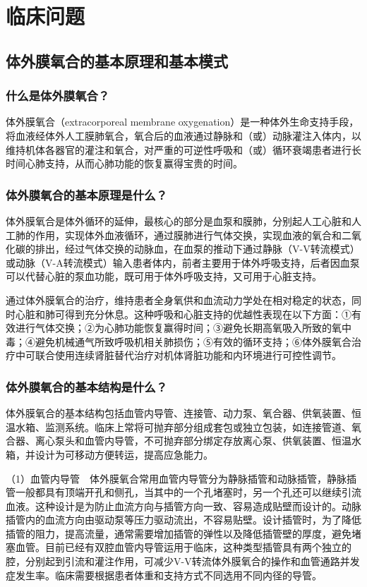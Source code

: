 \section{临床问题}

\subsection{体外膜氧合的基本原理和基本模式}

\subsubsection{什么是体外膜氧合？}

体外膜氧合（extracorporeal membrane
oxygenation）是一种体外生命支持手段，将血液经体外人工膜肺氧合，氧合后的血液通过静脉和（或）动脉灌注入体内，以维持机体各器官的灌注和氧合，对严重的可逆性呼吸和（或）循环衰竭患者进行长时间心肺支持，从而心肺功能的恢复赢得宝贵的时间。

\subsubsection{体外膜氧合的基本原理是什么？}

体外膜氧合是体外循环的延伸，最核心的部分是血泵和膜肺，分别起人工心脏和人工肺的作用，实现体外血液循环，通过膜肺进行气体交换，实现血液的氧合和二氧化碳的排出，经过气体交换的动脉血，在血泵的推动下通过静脉（V-V转流模式）或动脉（V-A转流模式）输入患者体内，前者主要用于体外呼吸支持，后者因血泵可以代替心脏的泵血功能，既可用于体外呼吸支持，又可用于心脏支持。

通过体外膜氧合的治疗，维持患者全身氧供和血流动力学处在相对稳定的状态，同时心脏和肺可得到充分休息。这种呼吸和心脏支持的优越性表现在以下方面：①有效进行气体交换；②为心肺功能恢复赢得时间；③避免长期高氧吸入所致的氧中毒；④避免机械通气所致呼吸机相关肺损伤；⑤有效的循环支持；⑥体外膜氧合治疗中可联合使用连续肾脏替代治疗对机体肾脏功能和内环境进行可控性调节。

\subsubsection{体外膜氧合的基本结构是什么？}

体外膜氧合的基本结构包括血管内导管、连接管、动力泵、氧合器、供氧装置、恒温水箱、监测系统。临床上常将可抛弃部分组成套包或独立包装，如连接管道、氧合器、离心泵头和血管内导管，不可抛弃部分绑定存放离心泵、供氧装置、恒温水箱，并设计为可移动方便转运，提高应急能力。

（1）血管内导管　体外膜氧合常用血管内导管分为静脉插管和动脉插管，静脉插管一般都具有顶端开孔和侧孔，当其中的一个孔堵塞时，另一个孔还可以继续引流血液。这种设计是为防止血流方向与插管方向一致、容易造成贴壁而设计的。动脉插管内的血流方向由驱动泵等压力驱动流出，不容易贴壁。设计插管时，为了降低插管的阻力，提高流量，通常需要增加插管的弹性以及降低插管壁的厚度，避免堵塞血管。目前已经有双腔血管内导管运用于临床，这种类型插管具有两个独立的腔，分别起到引流和灌注作用，可减少V-V转流体外膜氧合的操作和血管通路并发症发生率。临床需要根据患者体重和支持方式不同选用不同内径的导管。

